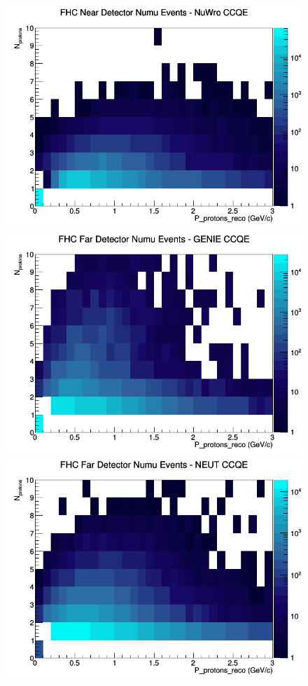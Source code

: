 \documentclass[12pt]{article}
\begin{document}
\begin{figure}[h]
\includegraphics[width=\linewidth]{eff_N_P/FGT/protons/CCQE_FHC_ND_numu_N_P_NuWro.png}
\endminipage
\newline
{}
\includegraphics[width=\linewidth]{eff_N_P/FGT/protons/CCQE_FHC_FD_numu_N_P_GENIE.png}
\endminipage
{}
\includegraphics[width=\linewidth]{eff_N_P/FGT/protons/CCQE_FHC_FD_numu_N_P_NEUT.png}

\end{figure}
\end{document}
